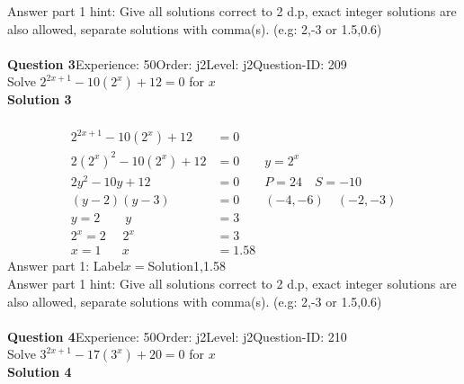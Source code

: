 \documentclass{article}
\begin{document}
Answer part 1 hint: \hspace{15pt} Give all solutions correct to 2 d.p, exact integer solutions are also allowed, separate solutions with comma(s). (e.g: 2,-3 or 1.5,0.6)\\
\\[4pt]
\noindent\textbf{Question 3}\hspace{20pt}Experience: 50\hspace{20pt}Order: j2\hspace{20pt}Level: j2\hspace{20pt}Question-ID: 209\\[2pt]
Solve $2^{2x+1}-10(2^x)+12=0$ for $x$\\[4pt]
\noindent\textbf{Solution 3}\\[2pt]
\\[-35pt]\begin{align*}
2^{2x+1}-10(2^x)+12&=0\\[2pt]
2(2^x)^2-10(2^x)+12&=0\qquad y=2^x\\[2pt]
2y^2-10y+12&=0\qquad P=24 \quad S=-10\\[2pt]
(y-2)(y-3)&=0\qquad (-4,-6)\quad (-2,-3)\\[2pt]
y=2 \qquad y&=3\\[2pt]
2^x=2\hspace{16pt} 2^x&=3\\[2pt]
x=1 \hspace{20pt} x&=1.58
\end{align*}
Answer part 1: \hspace{10pt}Label\hspace{10pt}$x=$\hspace{10pt}Solution\hspace{10pt}1,1.58\\
Answer part 1 hint: \hspace{15pt} Give all solutions correct to 2 d.p, exact integer solutions are also allowed, separate solutions with comma(s). (e.g: 2,-3 or 1.5,0.6)\\
\\[4pt]
\noindent\textbf{Question 4}\hspace{20pt}Experience: 50\hspace{20pt}Order: j2\hspace{20pt}Level: j2\hspace{20pt}Question-ID: 210\\[2pt]
Solve $3^{2x+1}-17(3^x)+20=0$ for $x$\\[4pt]
\noindent\textbf{Solution 4}\\[2pt]
\end{document}
